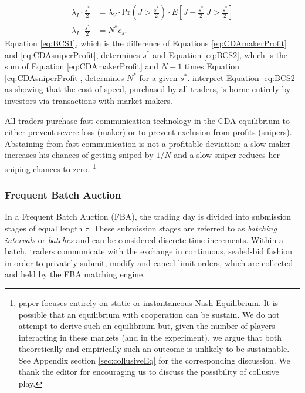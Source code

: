 \documentclass[12pt]{article}
\begin{document}
\begin{align}
\lambda_I \cdot \frac{s^*}{2} & = 
\lambda_V \cdot \textrm{Pr}\left(J > \frac{s^*}{2}\right) \cdot E\left[J-\frac{s^*}{2}|J>\frac{s^*}{2}\right] \label{eq:BCS1} \\
\lambda_I \cdot \frac{s^*}{2} & = N^* c_s. \label{eq:BCS2}
\end{align}
Equation \eqref{eq:BCS1}, which is the difference of Equations \eqref{eq:CDAmakerProfit} and \eqref{eq:CDAsniperProfit}, determines $s^*$ and Equation \eqref{eq:BCS2}, which is the sum of Equation \eqref{eq:CDAmakerProfit} and $N-1$ times Equation \eqref{eq:CDAsniperProfit}, determines $N^*$ for a given $s^*$. \cite{Budish2015} interpret Equation \eqref{eq:BCS2} as showing that the cost of speed, purchased by all traders, is borne entirely by investors via transactions with market makers.

All traders purchase fast communication technology in the CDA equilibrium to either prevent severe loss (maker) or to prevent exclusion from profits (snipers). Abstaining from fast communication is not a profitable deviation: a slow maker increases his chances of getting sniped by $1/N$ and a slow sniper reduces her sniping chances to zero. \footnote{ 
\cite{Budish2015} paper focuses entirely on static or instantaneous Nash Equilibrium. It is possible that an equilibrium with cooperation can be sustain. We do not attempt to derive such an equilibrium but, given the number of players interacting in these markets (and in the experiment), we argue that both theoretically and empirically such an outcome is unlikely to be sustainable. See Appendix section \ref{sec:collusiveEq} for the corresponding discussion.
We thank the editor for encouraging us to discuss the possibility of collusive play.
}

 


\subsubsection{Frequent Batch Auction}
In a Frequent Batch Auction (FBA), the trading day is divided into submission stages of equal length $\tau$. These submission stages are referred to as \textit{batching intervals} or \textit{batches} and can be considered discrete time increments. Within a batch, traders communicate with the exchange in continuous, sealed-bid fashion in order to privately submit, modify and cancel limit orders, which are collected and held by the FBA matching engine. 
\end{document}
